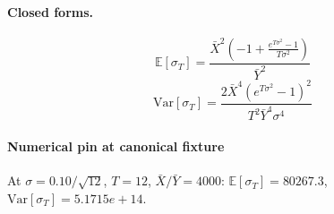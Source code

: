 \paragraph{Closed forms.}
\[ \mathbb{E}[\sigma_T] = \frac{\bar{X}^{2} \left(-1 + \frac{e^{T \sigma^{2}} - 1}{T \sigma^{2}}\right)}{\bar{Y}^{2}} \]
\[ \mathrm{Var}[\sigma_T] = \frac{2 \bar{X}^{4} \left(e^{T \sigma^{2}} - 1\right)^{2}}{T^{2} \bar{Y}^{4} \sigma^{4}} \]
\paragraph{Numerical pin at canonical fixture}
At $\sigma = 0.10 / \sqrt{12}$, $T = 12$, $\bar{X}/\bar{Y} = 4000$: $\mathbb{E}[\sigma_T] = 80267.3$, $\mathrm{Var}[\sigma_T] = 5.1715e+14$.
